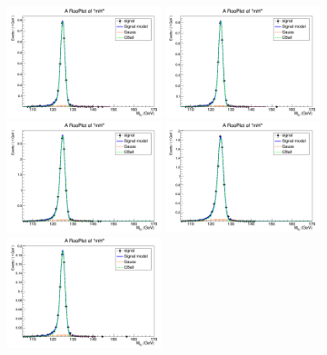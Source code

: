 \begin{figure}[htb]
	\begin{center}
		\includegraphics[width=0.40\textwidth]{fig/signal_fit/2016/sigfit_mu_ggF_1_125.png}
		\includegraphics[width=0.40\textwidth]{fig/signal_fit/2016/sigfit_mu_ggF_2_125.png}\\
		\includegraphics[width=0.40\textwidth]{fig/signal_fit/2016/sigfit_mu_ggF_3_125.png}
		\includegraphics[width=0.40\textwidth]{fig/signal_fit/2016/sigfit_mu_ggF_4_125.png}\\
		\includegraphics[width=0.40\textwidth]{fig/signal_fit/2016/sigfit_mu_VBF_501_125.png}

\end{center}
\end{figure}
